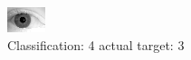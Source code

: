 \begin{figure}[h!]
\begin{center}
\includegraphics[width=0.60\columnwidth]{figures/ID2205_class_4_target_3.png}
\end{center}
\caption{ Classification: 4 actual target: 3}
\label{fig:ID2205_class_4_target_3}
\end{figure}
